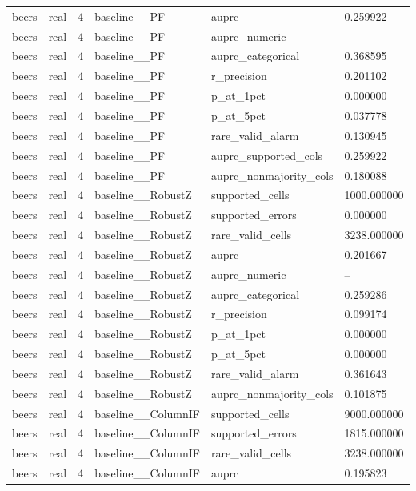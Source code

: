 \begin{tabular}{llllll}
beers & real & 4 & baseline\_\_PF & auprc & 0.259922 \\
beers & real & 4 & baseline\_\_PF & auprc\_numeric & -- \\
beers & real & 4 & baseline\_\_PF & auprc\_categorical & 0.368595 \\
beers & real & 4 & baseline\_\_PF & r\_precision & 0.201102 \\
beers & real & 4 & baseline\_\_PF & p\_at\_1pct & 0.000000 \\
beers & real & 4 & baseline\_\_PF & p\_at\_5pct & 0.037778 \\
beers & real & 4 & baseline\_\_PF & rare\_valid\_alarm & 0.130945 \\
beers & real & 4 & baseline\_\_PF & auprc\_supported\_cols & 0.259922 \\
beers & real & 4 & baseline\_\_PF & auprc\_nonmajority\_cols & 0.180088 \\
beers & real & 4 & baseline\_\_RobustZ & supported\_cells & 1000.000000 \\
beers & real & 4 & baseline\_\_RobustZ & supported\_errors & 0.000000 \\
beers & real & 4 & baseline\_\_RobustZ & rare\_valid\_cells & 3238.000000 \\
beers & real & 4 & baseline\_\_RobustZ & auprc & 0.201667 \\
beers & real & 4 & baseline\_\_RobustZ & auprc\_numeric & -- \\
beers & real & 4 & baseline\_\_RobustZ & auprc\_categorical & 0.259286 \\
beers & real & 4 & baseline\_\_RobustZ & r\_precision & 0.099174 \\
beers & real & 4 & baseline\_\_RobustZ & p\_at\_1pct & 0.000000 \\
beers & real & 4 & baseline\_\_RobustZ & p\_at\_5pct & 0.000000 \\
beers & real & 4 & baseline\_\_RobustZ & rare\_valid\_alarm & 0.361643 \\
beers & real & 4 & baseline\_\_RobustZ & auprc\_nonmajority\_cols & 0.101875 \\
beers & real & 4 & baseline\_\_ColumnIF & supported\_cells & 9000.000000 \\
beers & real & 4 & baseline\_\_ColumnIF & supported\_errors & 1815.000000 \\
beers & real & 4 & baseline\_\_ColumnIF & rare\_valid\_cells & 3238.000000 \\
beers & real & 4 & baseline\_\_ColumnIF & auprc & 0.195823 \\

\end{tabular}
